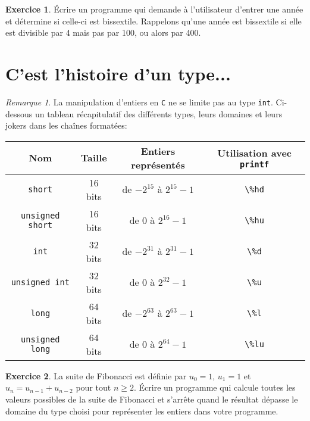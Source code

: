\documentclass[french,a4paper]{article}
\theoremstyle{definition}
\newtheorem{exercise}{Exercice}
\theoremstyle{remark}
\newtheorem*{remark}{Remarque}
\newcommand{\inlinec}[1]{\lstinline[style=C]°#1°}
\begin{document}
\begin{exercise}
  \'Ecrire un programme qui demande à l'utilisateur d'entrer une année
  et détermine si celle-ci est bissextile. Rappelons qu'une année est
  bissextile si elle est divisible par 4 mais pas par 100, ou alors
  par 400.
\end{exercise}

\section{C'est l'histoire d'un type...}
\label{sec:type-integers}

\begin{remark}
  La manipulation d'entiers en {\tt C} ne se limite pas au type
  \inlinec{int}. Ci-dessous un tableau récapitulatif des différents
  types, leurs domaines et leurs jokers dans les chaînes formatées:
  \begin{center}
    \begin{tabular}{|c|c|c|c|}
      \hline Nom & Taille & Entiers représentés & Utilisation avec {\inlinec{printf}} \\
      \hline {\inlinec{short}} & 16 bits & de $-2^{15}$ à $2^{15}-1$ & {\inlinec{\%hd}} \\
      \hline {\inlinec{unsigned short}} & 16 bits & de $0$ à $2^{16}-1$ & {\inlinec{\%hu}} \\
      \hline {\inlinec{int}} & 32 bits & de $-2^{31}$ à $2^{31}-1$ & {\inlinec{\%d}} \\
      \hline {\inlinec{unsigned int}} & 32 bits & de $0$ à $2^{32}-1$ & {\inlinec{\%u}} \\
      \hline {\inlinec{long}} & 64 bits & de $-2^{63}$ à $2^{63}-1$ & {\inlinec{\%l}} \\
      \hline {\inlinec{unsigned long}} & 64 bits & de $0$ à $2^{64}-1$ & {\inlinec{\%lu}} \\
      \hline
    \end{tabular}
  \end{center}
\end{remark}

\begin{exercise}
  La suite de Fibonacci est définie par $u_0=1$, $u_1=1$ et
  $u_n = u_{n-1} + u_{n-2}$ pour tout $n\geq 2$. \'Ecrire un programme
  qui calcule toutes les valeurs possibles de la suite de Fibonacci et
  s'arrête quand le résultat dépasse le domaine du type choisi pour
  représenter les entiers dans votre programme.
\end{exercise}
\end{document}
